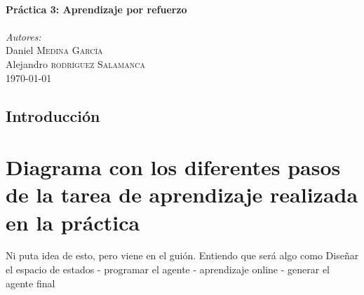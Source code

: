 \documentclass[12pt]{article}
\begin{document}
\begin{titlepage}
\HRule \\[0.7cm]
{ \huge \bfseries Práctica 3: Aprendizaje por refuerzo}\\[0.4cm] %
\HRule \\[0.7cm]


\textit{Autores:}\\
Daniel \textsc{Medina García}\\ %
Alejandro \textsc{rodríguez Salamanca}\\[1.1cm] %


{\large \today}\\ %


\vfill %

\end{titlepage}

\tableofcontents

\newpage
\thispagestyle{empty}
\clearpage
\vspace*{\fill}
\begin{center}
    \begin{minipage}{\textwidth}
        \begin{center}
            \section*{Introducción}
        \end{center}
    \end{minipage}
\end{center}
\vfill

\newpage

\section{Diagrama con los diferentes pasos de la tarea de aprendizaje realizada en la práctica}
Ni puta idea de esto, pero viene en el guión. Entiendo que será algo como
Diseñar el espacio de estados - programar el agente - aprendizaje online - generar el agente final
\end{document}
